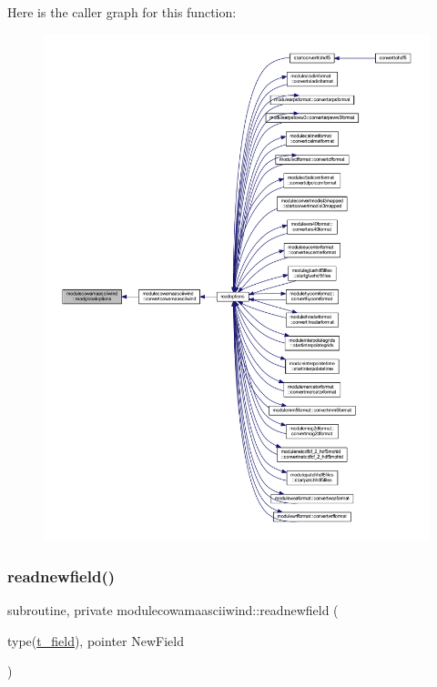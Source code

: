 Here is the caller graph for this function\+:\nopagebreak
\begin{figure}[H]
\begin{center}
\leavevmode
\includegraphics[width=350pt]{namespacemodulecowamaasciiwind_a8a6f6a971c31c5b3f8b965bb818c1cbc_icgraph}
\end{center}
\end{figure}
\mbox{\label{namespacemodulecowamaasciiwind_a34be2c2a2675d82ce063773657b99a0a}} 
\subsubsection{\texorpdfstring{readnewfield()}{readnewfield()}}
{\footnotesize\ttfamily subroutine, private modulecowamaasciiwind\+::readnewfield (\begin{DoxyParamCaption}\item[{type(\mbox{\hyperlink{structmodulecowamaasciiwind_1_1t__field}{t\+\_\+field}}), pointer}]{New\+Field }\end{DoxyParamCaption})\hspace{0.3cm}{\ttfamily [private]}}

